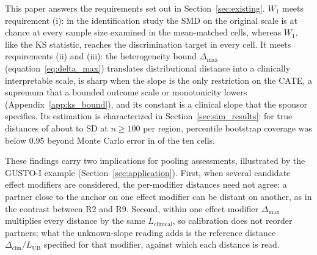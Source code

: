 \documentclass[AMA,Times1COL]{WileyNJDv5}
\begin{document}
This paper answers the requirements set out in Section~\ref{sec:existing}. $W_1$ meets requirement (i): in the identification study the SMD on the original scale is at chance at every sample size examined in the mean-matched cells, whereas $W_1$, like the KS statistic, reaches the discrimination target in every cell. It meets requirements (ii) and (iii): the heterogeneity bound \(\Delta_{\max}\) (equation~\ref{eq:delta_max}) translates distributional distance into a clinically interpretable scale, is sharp when the slope is the only restriction on the CATE, a supremum that a bounded outcome scale or monotonicity lowers (Appendix~\ref{app:ks_bound}), and its constant is a clinical slope that the sponsor specifies. Its estimation is characterized in Section~\ref{sec:sim_results}: for true distances of about  to  SD at $n \geq 100$ per region, percentile bootstrap coverage was below 0.95 beyond Monte Carlo error in  of the ten cells.

These findings carry two implications for pooling assessments, illustrated by the GUSTO-I example (Section~\ref{sec:application}). First, when several candidate effect modifiers are considered, the per-modifier distances need not agree: a partner close to the anchor on one effect modifier can be distant on another, as in the contrast between R2 and R9. Second, within one effect modifier $\Delta_{\max}$ multiplies every distance by the same $L_{\text{clinical}}$, so calibration does not reorder partners; what the unknown-slope reading adds is the reference distance $\Delta_{\text{clin}} / L_{\text{UB}}$ specified for that modifier, against which each distance is read.
\end{document}
